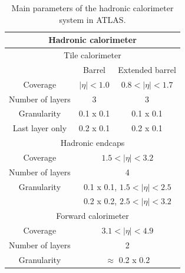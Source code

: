 \begin{table}
  \centering
  \begin{tabular}{ |c|c|c|}
  \hline
  \multicolumn{3}{|c|}{\textbf{Hadronic calorimeter}} \\
  \hline
  \hline
  \multicolumn{3}{|c|}{Tile calorimeter} \\
  \hline 
                     & Barrel                                   & Extended barrel \\
  Coverage           & $\mid\eta\mid<1.0$                       & $0.8<\mid\eta\mid<1.7$ \\
  \hline 
  Number of layers   & 3                                        & 3 \\
  \hline 
  Granularity        & 0.1 x 0.1				& 0.1 x 0.1 \\
  Last layer only    & 0.2 x 0.1				& 0.2 x 0.1 \\
  \hline 
  \hline
  \multicolumn{3}{|c|}{Hadronic endcaps} \\
  \hline 
  Coverage           & 	\multicolumn{2}{|c|}{$1.5<\mid\eta\mid<3.2$} \\
  \hline
  Number of layers   &  \multicolumn{2}{|c|}{ 4} \\
  \hline
  Granularity        & 	\multicolumn{2}{|c|}{0.1 x 0.1, $1.5<\mid\eta\mid<2.5$} \\
  		     &  \multicolumn{2}{|c|}{ 0.2 x 0.2, $2.5<\mid\eta\mid<3.2$} \\
  \hline
  \hline
  \multicolumn{3}{|c|}{Forward calorimeter} \\
  \hline
  Coverage	     & \multicolumn{2}{|c|}{$3.1<\mid\eta\mid<4.9$} \\
  \hline
  Number of layers   & \multicolumn{2}{|c|}{2} \\
  \hline
  Granularity        & \multicolumn{2}{|c|}{$\approx$ 0.2 x 0.2} \\
  \hline
  \end{tabular}
  \caption[Main parameters of the hadronic calorimeter system. ]
        {\small Main parameters of the hadronic calorimeter system in ATLAS.\cite{1748-0221-3-08-S08003} }
\label{table:HadCalo}
\end{table}

